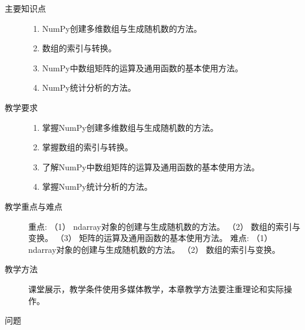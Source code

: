 \documentclass[12pt,a4paper,openany,cap]{ctexbook}
\begin{document}
\begin{description}
\item[主要知识点]
  \begin{minipage}[t]{0.8\linewidth}
    \begin{enumerate}
    \item  NumPy创建多维数组与生成随机数的方法。
\item\label{item:4}  数组的索引与转换。
\item\label{item:5}  NumPy中数组矩阵的运算及通用函数的基本使用方法。
\item\label{item:6}  NumPy统计分析的方法。
    \end{enumerate}
  \end{minipage}

\item[教学要求]
  \begin{minipage}[t]{0.8\linewidth}
    \begin{enumerate}
    \item        掌握NumPy创建多维数组与生成随机数的方法。
\item\label{item:7}  掌握数组的索引与转换。
\item\label{item:8}  了解NumPy中数组矩阵的运算及通用函数的基本使用方法。
\item\label{item:9}  掌握NumPy统计分析的方法。
    \end{enumerate}
  \end{minipage}
  \item[教学重点与难点]
            重点:
    （1） ndarray对象的创建与生成随机数的方法。
    （2） 数组的索引与变换。
    （3） 矩阵的运算及通用函数的基本使用方法。
            难点:
    （1） ndarray对象的创建与生成随机数的方法。
    （2） 数组的索引与变换。    
\item[教学方法]课堂展示，教学条件使用多媒体教学，本章教学方法要注重理论和实际操作。
\item[问题]


\end{description}
\end{document}
